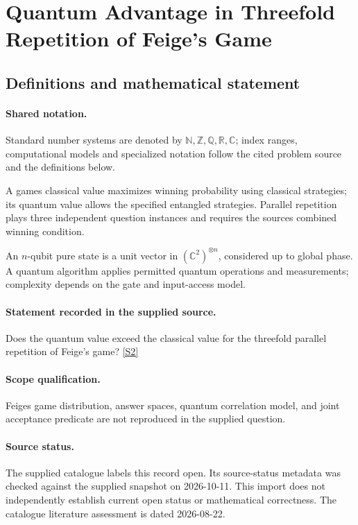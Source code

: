 \documentclass[11pt]{article}
\newcommand{\sref}[2]{\hyperlink{source:#1:#2}{[S#2]}}
\begin{document}
\section{Quantum Advantage in Threefold Repetition of Feige’s Game}\label{statement}

\subsection{Definitions and mathematical statement}

\paragraph{Shared notation.}Standard number systems are denoted by $\mathbb N,\mathbb Z,\mathbb Q,\mathbb R,\mathbb C$; index ranges, computational models and specialized notation follow the cited problem source and the definitions below.


A game\textquotesingle s classical value maximizes winning probability using classical strategies; its quantum value allows the specified entangled strategies. Parallel repetition plays three independent question instances and requires the source\textquotesingle s combined winning condition.

An $n$-qubit pure state is a unit vector in $(\mathbb C^2)^{\otimes n}$, considered up to global phase. A quantum algorithm applies permitted quantum operations and measurements; complexity depends on the gate and input-access model.
\paragraph{Statement recorded in the supplied source.}
Does the quantum value exceed the classical value for the threefold parallel repetition of Feige’s game? \sref{statement}{2}
\paragraph{Scope qualification.}
Feige\textquotesingle s game distribution, answer spaces, quantum correlation model, and joint acceptance predicate are not reproduced in the supplied question.
\paragraph{Source status.}
The supplied catalogue labels this record open. Its source-status metadata was checked against the supplied snapshot on 2026-10-11. This import does not independently establish current open status or mathematical correctness. The catalogue literature assessment is dated 2026-08-22.
\end{document}
